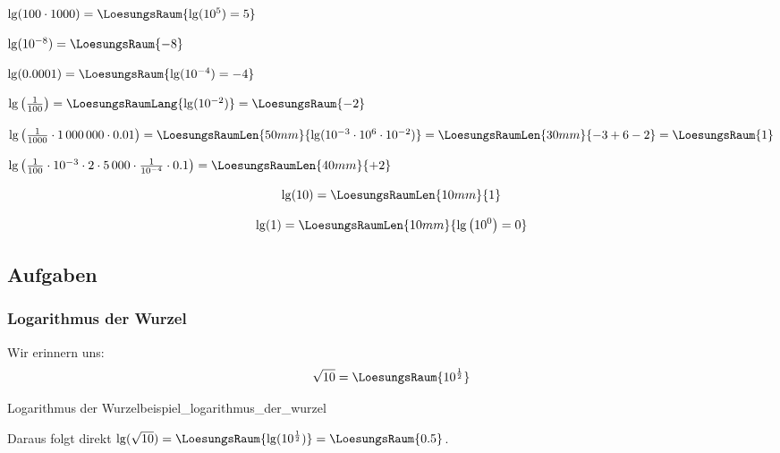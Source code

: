 $\lg(100 \cdot{} 1000) = \LoesungsRaum{\lg(10^5)=5}$
\leserluft{}

$\lg(10^{-8}) = \LoesungsRaum{-8}$
\leserluft{}

$\lg(0.0001) = \LoesungsRaum{\lg(10^{-4})=-4}$

$\lg\left(\frac1{100}\right) =\LoesungsRaumLang{\lg(10^{-2}) } = \LoesungsRaum{-2}$
\leserluft{}

$\lg\left(\frac1{1000}\cdot{} 1\,000\,000 \cdot{} 0.01\right)
=\LoesungsRaumLen{50mm}{\lg(10^{-3} \cdot{} 10^6 \cdot{} 10^{-2}) } =
\LoesungsRaumLen{30mm}{-3 + 6 - 2} = \LoesungsRaum{1}$

$\lg\left(\frac1{100}\cdot{}10^{-3}\cdot{}2\cdot{} 5\,000 \cdot{} \frac1{10^{-4}}\cdot{} 0.1\right) = \LoesungsRaumLen{40mm}{+2}$

\newpage



\begin{gesetz}{}{}
$$\lg(10) = \LoesungsRaumLen{10mm}{1}$$
\end{gesetz}

\begin{gesetz}{}{}
$$\lg(1) = \LoesungsRaumLen{10mm}{\lg\left(10^0\right) = 0}$$
\end{gesetz}

\subsection*{Aufgaben}













\newpage
\subsubsection{Logarithmus der Wurzel}
Wir erinnern uns: $$\sqrt{10} =\LoesungsRaum{ 10^\frac12}$$
\begin{beispiel}{Logarithmus der
    Wurzel}{beispiel_logarithmus_der_wurzel}

  Daraus folgt direkt $\lg(\sqrt{10}) = \LoesungsRaum{\lg(10^\frac12)}  = \LoesungsRaum{0.5}$.
\end{beispiel}


